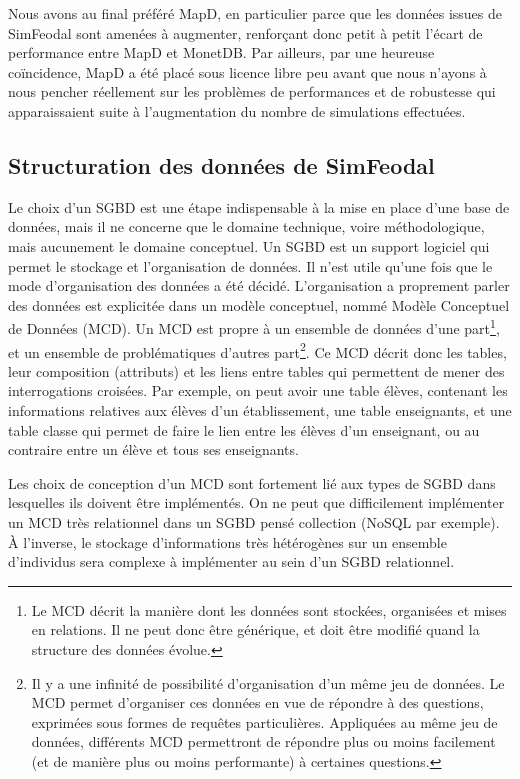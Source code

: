 Nous avons au final préféré MapD, en particulier parce que les données issues de SimFeodal sont amenées à augmenter, renforçant donc petit à petit l'écart de performance entre MapD et MonetDB.
Par ailleurs, par une heureuse coïncidence, MapD a été placé sous licence libre peu avant que nous n'ayons à nous pencher réellement sur les problèmes de performances et de robustesse qui apparaissaient suite à l'augmentation du nombre de simulations effectuées.


\subsection{Structuration des données de SimFeodal}

Le choix d'un SGBD est une étape indispensable à la mise en place d'une base de données, mais il ne concerne que le domaine technique, voire méthodologique, mais aucunement le domaine conceptuel.
Un SGBD est un support logiciel qui permet le stockage et l'organisation de données.
Il n'est utile qu'une fois que le mode d'organisation des données a été décidé.
L'organisation a proprement parler des données est explicitée dans un modèle conceptuel, nommé Modèle Conceptuel de Données (MCD).
Un MCD est propre à un ensemble de données d'une part\footnote{
	Le MCD décrit la manière dont les données sont stockées, organisées et mises en relations.
	Il ne peut donc être générique, et doit être modifié quand la structure des données évolue.
}, et un ensemble de problématiques d'autres part\footnote{
	Il y a une infinité de possibilité d'organisation d'un même jeu de données.
	Le MCD permet d'organiser ces données en vue de répondre à des questions, exprimées sous formes de requêtes particulières.
	Appliquées au même jeu de données, différents MCD permettront de répondre plus ou moins facilement (et de manière plus ou moins performante) à certaines questions.
}.
Ce MCD décrit donc les \og tables\fg{}, leur composition (attributs) et les liens entre tables qui permettent de mener des interrogations croisées.
Par exemple, on peut avoir une table élèves, contenant les informations relatives aux élèves d'un établissement, une table enseignants, et une table classe qui permet de faire le lien entre les élèves d'un enseignant, ou au contraire entre un élève et tous ses enseignants.

Les choix de conception d'un MCD sont fortement lié aux types de SGBD dans lesquelles ils doivent être implémentés.
On ne peut que difficilement implémenter un MCD très relationnel dans un SGBD pensé collection (NoSQL par exemple).
À l'inverse, le stockage d'informations très hétérogènes sur un ensemble d'individus sera complexe à implémenter au sein d'un SGBD relationnel.

